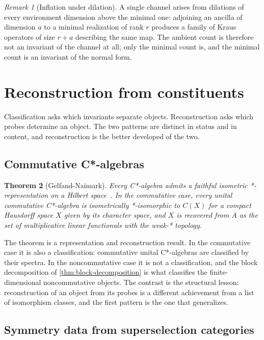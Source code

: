 \documentclass[11pt,letterpaper]{article}
\newtheorem{theorem}{Theorem}[section]
\theoremstyle{definition}
\theoremstyle{remark}
\newtheorem{remark}[theorem]{Remark}
\begin{document}
\begin{remark}[Inflation under dilation]
A single channel arises from dilations of every environment dimension above the minimal one: adjoining an ancilla of dimension $a$ to a minimal realization of rank $r$ produces a family of Kraus operators of size $r + a$ describing the same map. The ambient count is therefore not an invariant of the channel at all; only the minimal count is, and the minimal count is an invariant of the normal form.
\end{remark}

\section{Reconstruction from constituents}

Classification asks which invariants separate objects. Reconstruction asks which probes determine an object. The two patterns are distinct in status and in content, and reconstruction is the better developed of the two.

\subsection{Commutative C*-algebras}

\begin{theorem}[Gelfand-Naimark]
\label{thm:gelfand-naimark}
Every C*-algebra admits a faithful isometric *-representation on a Hilbert space~\cite{gelfand-naimark}. In the commutative case, every unital commutative C*-algebra is isometrically *-isomorphic to $C(X)$ for a compact Hausdorff space $X$ given by its character space, and $X$ is recovered from $A$ as the set of multiplicative linear functionals with the weak-* topology.
\end{theorem}

The theorem is a representation and reconstruction result. In the commutative case it is also a classification: commutative unital C*-algebras are classified by their spectra. In the noncommutative case it is not a classification, and the block decomposition of \cref{thm:block-decomposition} is what classifies the finite-dimensional noncommutative objects. The contrast is the structural lesson: reconstruction of an object from its probes is a different achievement from a list of isomorphism classes, and the first pattern is the one that generalizes.

\subsection{Symmetry data from superselection categories}
\end{document}
